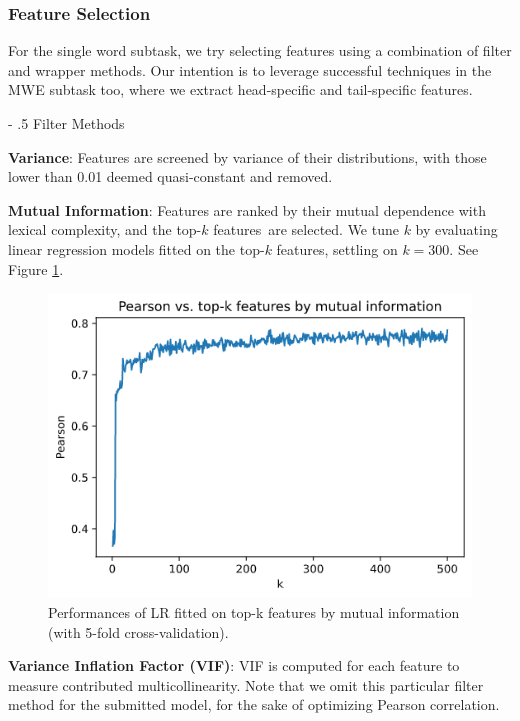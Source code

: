 \documentclass[11pt,a4paper]{article}
\makeatletter
\renewcommand\paragraph{%
    \@startsection{paragraph}{4}{0mm}%
        {-\baselineskip}%
        {.5\baselineskip}%
        {\normalfont\normalsize\bfseries}}
\makeatother
\begin{document}
\subsubsection{Feature Selection}

For the single word subtask, we try selecting features using a combination of filter and wrapper methods. Our intention is to leverage successful techniques in the MWE subtask too, where we extract head-specific and tail-specific features.

\paragraph{Filter Methods}

\textbf{Variance}: Features are screened by variance of their distributions, with those lower than 0.01 deemed quasi-constant and removed. 

\textbf{Mutual Information}: Features are ranked by their mutual dependence with lexical complexity, and the top-$k$ features are selected. We tune $k$ by evaluating linear regression models fitted on the top-$k$ features, settling on $k=300$. See Figure \ref{fig:mi}.

\begin{figure}
  \centering
  \includegraphics[scale=0.4]{mi.png}
  \caption{\label{fig:mi} Performances of LR fitted on top-k features by mutual information (with 5-fold cross-validation).}
\end{figure}

\textbf{Variance Inflation Factor (VIF)}: VIF is computed for each feature to measure contributed multicollinearity. Note that we omit this particular filter method for the submitted model, for the sake of optimizing Pearson correlation.
\end{document}
